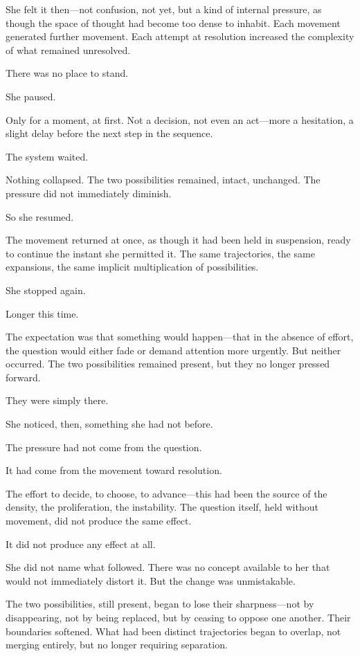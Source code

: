 She felt it then---not confusion, not yet, but a kind of internal
pressure, as though the space of thought had become too dense to
inhabit. Each movement generated further movement. Each attempt
at resolution increased the complexity of what remained
unresolved.

There was no place to stand.

\scenebreak

She paused.

Only for a moment, at first. Not a decision, not even an
act---more a hesitation, a slight delay before the next step in
the sequence.

The system waited.

Nothing collapsed. The two possibilities remained, intact,
unchanged. The pressure did not immediately diminish.

So she resumed.

The movement returned at once, as though it had been held in
suspension, ready to continue the instant she permitted it. The
same trajectories, the same expansions, the same implicit
multiplication of possibilities.

She stopped again.

Longer this time.

The expectation was that something would happen---that in the
absence of effort, the question would either fade or demand
attention more urgently. But neither occurred. The two
possibilities remained present, but they no longer pressed
forward.

They were simply there.

She noticed, then, something she had not before.

The pressure had not come from the question.

It had come from the movement toward resolution.

The effort to decide, to choose, to advance---this had been the
source of the density, the proliferation, the instability. The
question itself, held without movement, did not produce the same
effect.

It did not produce any effect at all.

\scenebreak

She did not name what followed. There was no concept available to
her that would not immediately distort it. But the change was
unmistakable.

The two possibilities, still present, began to lose their
sharpness---not by disappearing, not by being replaced, but by
ceasing to oppose one another. Their boundaries softened. What
had been distinct trajectories began to overlap, not merging
entirely, but no longer requiring separation.

